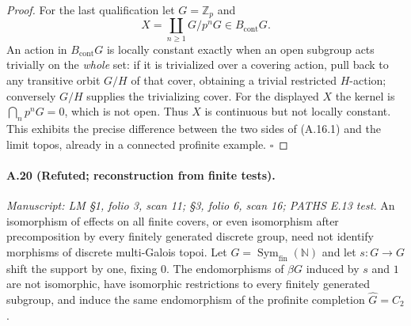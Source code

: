 \begin{proof}
For the last qualification let $G=\mathbb Z_p$ and
\[
 X=\coprod_{n\ge1}G/p^nG\in B_{\mathrm{cont}}G.
\]
An action in $B_{\mathrm{cont}}G$ is locally constant exactly when an open subgroup acts trivially on the \emph{whole} set: if it is trivialized over a covering action, pull back to any transitive orbit $G/H$ of that cover, obtaining a trivial restricted $H$-action; conversely $G/H$ supplies the trivializing cover. For the displayed $X$ the kernel is $\bigcap_np^nG=0$, which is not open. Thus $X$ is continuous but not locally constant. This exhibits the precise difference between the two sides of (A.16.1) and the limit topos, already in a connected profinite example. \hfill$\square$
\end{proof}

\paragraph{A.20 (Refuted; reconstruction from finite tests).}
\textit{Manuscript: LM \S1, folio 3, scan 11; \S3, folio 6, scan 16; PATHS E.13 test.}
An isomorphism of effects on all finite covers, or even isomorphism after precomposition by every finitely generated discrete group, need not identify morphisms of discrete multi-Galois topoi. Let $G=\operatorname{Sym}_{\mathrm{fin}}(\mathbb N)$ and let $s:G\to G$ shift the support by one, fixing $0$. The endomorphisms of $\beta G$ induced by $s$ and $1$ are not isomorphic, have isomorphic restrictions to every finitely generated subgroup, and induce the same endomorphism of the profinite completion $\widehat G=C_2$.
